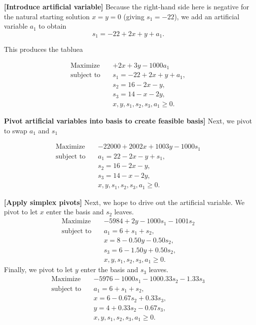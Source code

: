 \textbf{[Introduce artificial variable]} Because the right-hand side here is negative for the natural starting solution \(x=y=0\) (giving \(s_1=-22\)), we add an artificial variable \(a_1\) to obtain
\[
s_1  = -22 + 2x + y + a_1.
\]

This produces the tabluea

\[
\begin{aligned}
\text{Maximize}\quad & + 2x + 3y - 1000a_1 \\
\text{subject to}\quad & s_1 = -22 + 2x + y + a_1,\\ 
& s_2 = 16 - 2x - y,\\ 
& s_3 = 14 - x - 2y,\\ 
& x, y, s_1, s_2, s_3, a_1 \ge 0.
\end{aligned}
\]

\textbf{Pivot artificial variables into basis to create feasible basis]} 
Next, we pivot to swap $a_1$ and $s_1$

\[
\begin{aligned}
\text{Maximize}\quad & -22000 + 2002x + 1003y - 1000s_1 \\
\text{subject to}\quad & a_1 = 22 - 2x - y + s_1,\\ 
& s_2 = 16 - 2x - y,\\ 
& s_3 = 14 - x - 2y,\\ 
& x, y, s_1, s_2, s_3, a_1 \ge 0.
\end{aligned}
\]

\textbf{[Apply simplex pivots]} Next, we hope to drive out the artificial variable.  We pivot to let $x$ enter the basis and $s_2$ leaves.
\[
\begin{aligned}
\text{Maximize}\quad & -5984 + 2y - 1000s_1 - 1001s_2 \\
\text{subject to}\quad & a_1 = 6 + s_1 + s_2,\\[1mm]
& x = 8 - 0.50y - 0.50s_2,\\[1mm]
& s_3 = 6 - 1.50y + 0.50s_2,\\[1mm]
& x, y, s_1, s_2, s_3, a_1 \geq 0.
\end{aligned}
\]
Finally, we pivot to let $y$ enter the basis and $s_3$ leaves.
\[
\begin{aligned}
\text{Maximize}\quad & -5976 - 1000s_1 - 1000.33s_2 - 1.33s_3 \\
\text{subject to}\quad & a_1 = 6 + s_1 + s_2,\\[1mm]
& x = 6 - 0.67s_2 + 0.33s_3,\\[1mm]
& y = 4 + 0.33s_2 - 0.67s_3,\\[1mm]
& x, y, s_1, s_2, s_3, a_1 \geq 0.
\end{aligned}
\]

